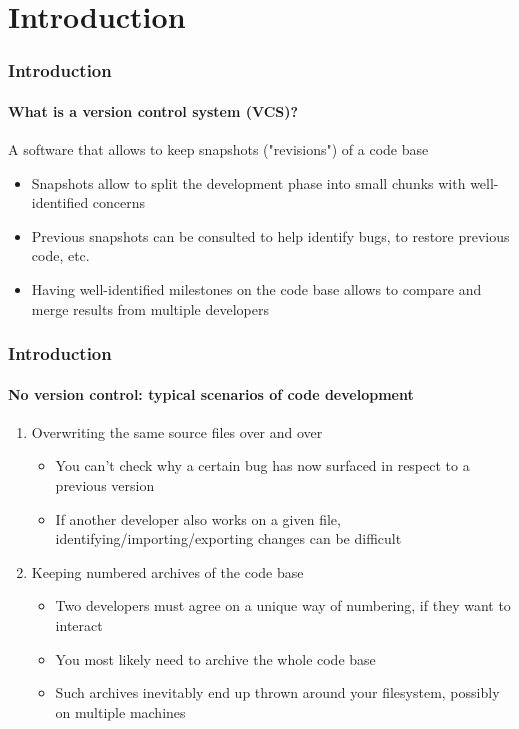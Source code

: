\section{Introduction}

\begin{frame}
\frametitle{Introduction}
\framesubtitle{What is a version control system (VCS)?}

\begin{block}{A software that allows to keep snapshots ("revisions") of a code base}
\begin{itemize}
\item Snapshots allow to split the development phase into small chunks with well-identified concerns
\item Previous snapshots can be consulted to help identify bugs, to restore previous code, etc.
\item Having well-identified milestones on the code base allows to compare and merge results from multiple developers
\end{itemize}
\end{block}

\end{frame}

\begin{frame}
\frametitle{Introduction}
\framesubtitle{No version control: typical scenarios of code development}

\begin{enumerate}
\item
\begin{block}{Overwriting the same source files over and over}
\begin{itemize}
\item You can't check why a certain bug has now surfaced in respect to a previous version
\item If another developer also works on a given file, identifying/importing/exporting changes can be difficult
\end{itemize}
\end{block}
\pause
\item
\begin{block}{Keeping numbered archives of the code base}
\begin{itemize}
\item Two developers must agree on a unique way of numbering, if they want to interact
\item You most likely need to archive the whole code base
\item Such archives inevitably end up thrown around your filesystem, possibly on multiple machines
\end{itemize}
\end{block}
\end{enumerate}

\end{frame}

